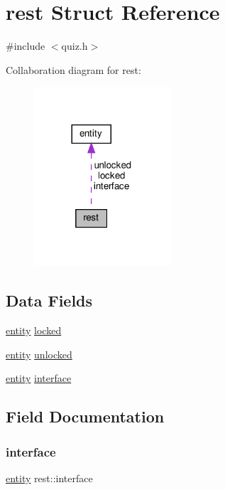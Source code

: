 \hypertarget{structrest}{}\section{rest Struct Reference}
\label{structrest}


{\ttfamily \#include $<$quiz.\+h$>$}



Collaboration diagram for rest\+:\nopagebreak
\begin{figure}[H]
\begin{center}
\leavevmode
\includegraphics[width=144pt]{structrest__coll__graph}
\end{center}
\end{figure}
\subsection*{Data Fields}
\begin{DoxyCompactItemize}
\item 
\hyperlink{structentity}{entity} \hyperlink{structrest_a063deafa8d3ed41705500b552d9f0e45}{locked}
\item 
\hyperlink{structentity}{entity} \hyperlink{structrest_abdff2c3af489753d37c46a6a2ea318f5}{unlocked}
\item 
\hyperlink{structentity}{entity} \hyperlink{structrest_aa84bc4cd6a7f30715c8dbf1de17b01d0}{interface}
\end{DoxyCompactItemize}


\subsection{Field Documentation}
\mbox{\label{structrest_aa84bc4cd6a7f30715c8dbf1de17b01d0}} 
\subsubsection{\texorpdfstring{interface}{interface}}
{\footnotesize\ttfamily \hyperlink{structentity}{entity} rest\+::interface}

